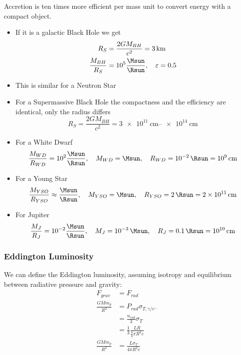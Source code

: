 \documentclass[10pt,a4paper,english]{article}
\begin{document}
Accretion is ten times more efficient per mass unit to convert energy with a compact object.
\begin{itemize}
    \item If it is a galactic Black Hole we get
          \begin{align*}
              R_{S} &=\frac{2 G M_{BH}}{c^2} = \SI{3}{\km} \\
              \frac{M_{BH}}{R_{S}} &= 10^5 \frac{\si{\Msun}}{\si{\Rsun}}, \quad \varepsilon = 0.5
          \end{align*}
    \item This is similar for a Neutron Star
    \item For a Supermassive Black Hole the compactness and the efficiency are identical, only the radius differs
          \begin{equation*}
              R_{S} =\frac{2 G M_{BH}}{c^2} = \SIrange{3e11}{e14}{\cm}
          \end{equation*}
    \item For a White Dwarf
          \begin{equation*}
              \frac{M_{WD}}{R_{WD}} = 10^2 \frac{\si{\Msun}}{\si{\Rsun}}, \quad M_{WD} = \si{\Msun}, \quad R_{WD} = \SI{e-2}{\Rsun} = \SI{e9}{\cm}
          \end{equation*}
    \item For a Young Star
          \begin{equation*}
              \frac{M_{YSO}}{R_{YSO}} \approx \frac{\si{\Msun}}{\si{\Rsun}}, \quad M_{YSO} = \si{\Msun}, \quad R_{YSO} = \SI{2}{\Rsun} = \SI{2e11}{\cm}
          \end{equation*}
    \item For Jupiter
          \begin{equation*}
              \frac{M_J}{R_J} = 10^{-2} \frac{\si{\Msun}}{\si{\Rsun}}, \quad M_{J} = \SI{e-3}{\Msun}, \quad R_J = \SI{0.1}{\Rsun} = \SI{e10}{\cm}
          \end{equation*}
\end{itemize}

\subsubsection{Eddington Luminosity}

We can define the Eddington luminosity, assuming isotropy and equilibrium between radiative pressure and gravity:
\begin{align*}
    F_{grav} & = F_{rad} \\
    \frac{G M m_p}{R^2} &= P_{rad}\sigma_{T,\gamma/e^-} \\
                        &= \frac{u_{rad}}{3}\sigma_T \\
                        &= \frac{1}{3}\frac{L R}{\frac{4}{3}\pi R^3 c}\\
    \frac{G M m_p}{R^2} &= \frac{L\sigma_T}{4\pi R^2 c}
\end{align*}
\end{document}
